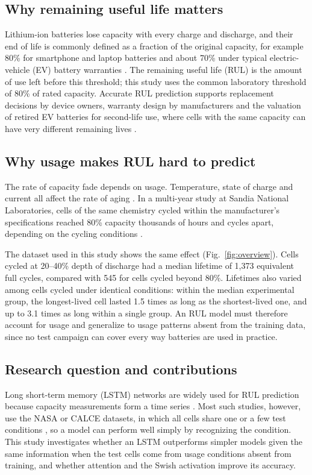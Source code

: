 \documentclass[conference]{IEEEtran}
\begin{document}
\subsection{Why remaining useful life matters}
\label{sec:why}
Lithium-ion batteries lose capacity with every charge and discharge, and their end of life is commonly defined as a fraction of the original capacity, for example 80\% for smartphone and laptop batteries \cite{apple} and about 70\% under typical electric-vehicle (EV) battery warranties \cite{npr2026}. The remaining useful life (RUL) is the amount of use left before this threshold; this study uses the common laboratory threshold of 80\% of rated capacity. Accurate RUL prediction supports replacement decisions by device owners, warranty design by manufacturers and the valuation of retired EV batteries for second-life use, where cells with the same capacity can have very different remaining lives \cite{gu2024}.

\subsection{Why usage makes RUL hard to predict}
The rate of capacity fade depends on usage. Temperature, state of charge and current all affect the rate of aging \cite{woody2020}. In a multi-year study at Sandia National Laboratories, cells of the same chemistry cycled within the manufacturer's specifications reached 80\% capacity thousands of hours and cycles apart, depending on the cycling conditions \cite{preger2020}.

The dataset used in this study shows the same effect (Fig.~\ref{fig:overview}). Cells cycled at 20--40\% depth of discharge had a median lifetime of 1,373 equivalent full cycles, compared with 545 for cells cycled beyond 80\%. Lifetimes also varied among cells cycled under identical conditions: within the median experimental group, the longest-lived cell lasted 1.5 times as long as the shortest-lived one, and up to 3.1 times as long within a single group. An RUL model must therefore account for usage and generalize to usage patterns absent from the training data, since no test campaign can cover every way batteries are used in practice.

\subsection{Research question and contributions}
Long short-term memory (LSTM) networks \cite{hochreiter1997} are widely used for RUL prediction because capacity measurements form a time series \cite{liu2017,zraibi2025}. Most such studies, however, use the NASA or CALCE datasets, in which all cells share one or a few test conditions \cite{chen2023,tran2025}, so a model can perform well simply by recognizing the condition. This study investigates whether an LSTM outperforms simpler models given the same information when the test cells come from usage conditions absent from training, and whether attention and the Swish activation improve its accuracy.
\end{document}
